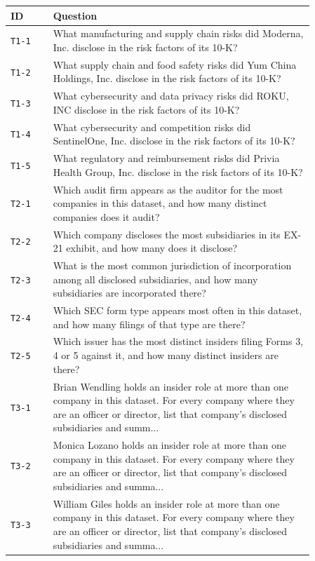 \begin{tabular}{@{}lp{0.86\linewidth}@{}}
\toprule
\textbf{ID} & \textbf{Question} \\
\midrule
\texttt{T1-1} & What manufacturing and supply chain risks did Moderna, Inc. disclose in the risk factors of its 10-K? \\
\texttt{T1-2} & What supply chain and food safety risks did Yum China Holdings, Inc. disclose in the risk factors of its 10-K? \\
\texttt{T1-3} & What cybersecurity and data privacy risks did ROKU, INC disclose in the risk factors of its 10-K? \\
\texttt{T1-4} & What cybersecurity and competition risks did SentinelOne, Inc. disclose in the risk factors of its 10-K? \\
\texttt{T1-5} & What regulatory and reimbursement risks did Privia Health Group, Inc. disclose in the risk factors of its 10-K? \\
\texttt{T2-1} & Which audit firm appears as the auditor for the most companies in this dataset, and how many distinct companies does it audit? \\
\texttt{T2-2} & Which company discloses the most subsidiaries in its EX-21 exhibit, and how many does it disclose? \\
\texttt{T2-3} & What is the most common jurisdiction of incorporation among all disclosed subsidiaries, and how many subsidiaries are incorporated there? \\
\texttt{T2-4} & Which SEC form type appears most often in this dataset, and how many filings of that type are there? \\
\texttt{T2-5} & Which issuer has the most distinct insiders filing Forms 3, 4 or 5 against it, and how many distinct insiders are there? \\
\texttt{T3-1} & Brian Wendling holds an insider role at more than one company in this dataset. For every company where they are an officer or director, list that company's disclosed subsidiaries and summ... \\
\texttt{T3-2} & Monica Lozano holds an insider role at more than one company in this dataset. For every company where they are an officer or director, list that company's disclosed subsidiaries and summa... \\
\texttt{T3-3} & William Giles holds an insider role at more than one company in this dataset. For every company where they are an officer or director, list that company's disclosed subsidiaries and summa... \\

\end{tabular}

